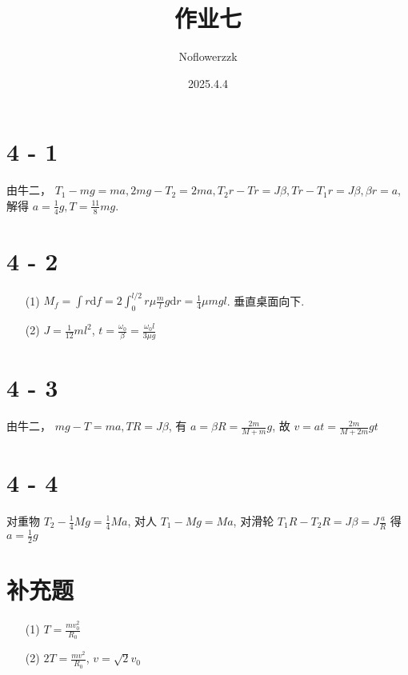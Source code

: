 \documentclass{article}
\title{作业七}
\author{Noflowerzzk}
\date{2025.4.4}
\newcommand{\dd}{\mathrm{d}}
\begin{document}
\maketitle

\section*{4 - 1}

由牛二， $T_1 - mg = ma, 2mg - T_2 = 2ma, T_2r - Tr = J\beta, Tr - T_1r = J\beta, \beta r = a$, 解得 $a = \frac{1}{4}g, T = \frac{11}{8}mg$.

\section*{4 - 2}

\begin{itemize}
    \item [(1)] $M_f = \int r \dd f = 2 \int_{0}^{l/2}r \mu \frac{m}{l}g \dd r = \frac{1}{4}\mu mgl$. 垂直桌面向下.
    \item [(2)] $J = \frac{1}{12}ml^2$, $t = \frac{\omega_0}{\beta} = \frac{\omega_0l}{3\mu g}$
\end{itemize}

\section*{4 - 3}

由牛二， $mg - T = ma, TR = J\beta$, 有 $a = \beta R = \frac{2m}{M + m}g$, 故 $v = at = \frac{2m}{M + 2m}gt$

\section*{4 - 4}

对重物 $T_2 - \frac{1}{4}Mg = \frac{1}{4}Ma$, 对人 $T_1 - Mg = Ma$, 对滑轮 $T_1R - T_2R = J\beta = J\frac{a}{R}$ 得 $a = \frac{1}{2}g$

\section*{补充题}

\begin{itemize}
    \item [(1)] $T = \frac{mv_0^2}{R_0}$
    \item [(2)] $2T = \frac{mv^2}{R_0}$, $v = \sqrt{2}v_0$
\end{itemize}
\end{document}
